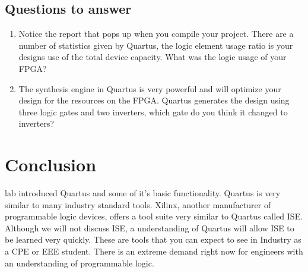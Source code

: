    \subsection{Questions to answer}
    \begin{enumerate}
      \item Notice the report that pops up when you compile your project. There are a number of statistics given by Quartus, the logic element usage ratio is your designs use of the total device capacity. What was the logic usage of your FPGA?
      \item The synthesis engine in Quartus is very powerful and will optimize your design for the resources on the   FPGA. Quartus generates the design using three logic gates and two inverters, which gate do you think it changed to inverters?
    \end{enumerate}

  \section{Conclusion}
     lab introduced Quartus and some of it's basic functionality. Quartus is very similar to many industry standard tools. Xilinx, another manufacturer of programmable logic devices, offers a tool suite very similar to Quartus called ISE. Although we will not discuss ISE, a understanding of Quartus will allow ISE to be learned very quickly. These are tools that you can expect to see in Industry as a CPE or EEE student. There is an extreme demand right now for engineers with an understanding of programmable logic.

  


